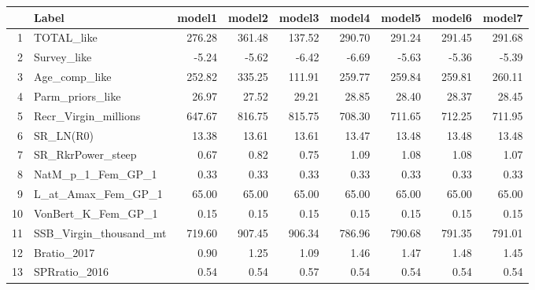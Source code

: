 \begin{table}[ht]
\centering
\begin{tabular}{rlrrrrrrr}
  \hline
 & Label & model1 & model2 & model3 & model4 & model5 & model6 & model7 \\ 
  \hline
1 & TOTAL\_like & 276.28 & 361.48 & 137.52 & 290.70 & 291.24 & 291.45 & 291.68 \\ 
  2 & Survey\_like & -5.24 & -5.62 & -6.42 & -6.69 & -5.63 & -5.36 & -5.39 \\ 
  3 & Age\_comp\_like & 252.82 & 335.25 & 111.91 & 259.77 & 259.84 & 259.81 & 260.11 \\ 
  4 & Parm\_priors\_like & 26.97 & 27.52 & 29.21 & 28.85 & 28.40 & 28.37 & 28.45 \\ 
  5 & Recr\_Virgin\_millions & 647.67 & 816.75 & 815.75 & 708.30 & 711.65 & 712.25 & 711.95 \\ 
  6 & SR\_LN(R0) & 13.38 & 13.61 & 13.61 & 13.47 & 13.48 & 13.48 & 13.48 \\ 
  7 & SR\_RkrPower\_steep & 0.67 & 0.82 & 0.75 & 1.09 & 1.08 & 1.08 & 1.07 \\ 
  8 & NatM\_p\_1\_Fem\_GP\_1 & 0.33 & 0.33 & 0.33 & 0.33 & 0.33 & 0.33 & 0.33 \\ 
  9 & L\_at\_Amax\_Fem\_GP\_1 & 65.00 & 65.00 & 65.00 & 65.00 & 65.00 & 65.00 & 65.00 \\ 
  10 & VonBert\_K\_Fem\_GP\_1 & 0.15 & 0.15 & 0.15 & 0.15 & 0.15 & 0.15 & 0.15 \\ 
  11 & SSB\_Virgin\_thousand\_mt & 719.60 & 907.45 & 906.34 & 786.96 & 790.68 & 791.35 & 791.01 \\ 
  12 & Bratio\_2017 & 0.90 & 1.25 & 1.09 & 1.46 & 1.47 & 1.48 & 1.45 \\ 
  13 & SPRratio\_2016 & 0.54 & 0.54 & 0.57 & 0.54 & 0.54 & 0.54 & 0.54 \\ 
   \hline
\end{tabular}
\end{table}
